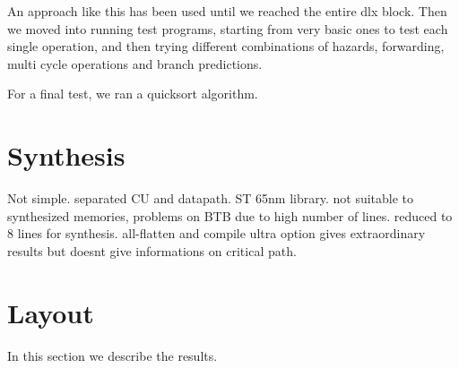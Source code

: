 \documentclass[12pt]{article}
\begin{document}
An approach like this has been used until we reached the entire dlx block.
Then we moved into running test programs, starting from very basic ones to test each single operation, and then trying different combinations of hazards, forwarding, multi cycle operations and branch predictions.

For a final test, we ran a quicksort algorithm.

  

\section{Synthesis}\label{Synthesis}
Not simple. separated CU and datapath.
ST 65nm library. not suitable to synthesized memories, problems on BTB due to high number of lines. reduced to 8 lines for synthesis. 
all-flatten and compile ultra option gives extraordinary results but doesnt give informations on critical path.



\section{Layout}\label{Layout}
In this section we describe the results.



\end{document}

